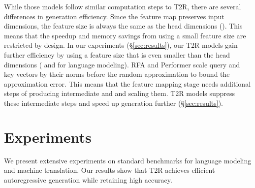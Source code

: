 \documentclass[11pt,a4paper]{article}
\newcommand{\TRNN}{T2R\xspace}
\begin{document}
While those models follow similar computation steps to \TRNN, there are several differences in generation efficiency.
Since the  feature map \cite{katharopoulos-et-al-2020} preserves input dimensions, the feature size is always the same as the head dimensions ().
This means that the speedup and memory savings from using a small feature size are restricted by design.
In our experiments (\S\ref{sec:results}), our \TRNN models gain further efficiency by using a feature size that is even smaller than the head dimensions ( and  for language modeling).
RFA and Performer scale query and key vectors by their norms before the random approximation to bound the approximation error.
This means that the feature mapping stage needs additional steps of producing intermediate  and  and scaling them.
\TRNN models suppress these intermediate steps and speed up generation further (\S\ref{sec:results}).









\section{Experiments}
\label{sec:experiments}
We present extensive experiments on standard benchmarks for language modeling and machine translation.
Our results show that \TRNN achieves efficient autoregressive generation while retaining high accuracy.
\end{document}
